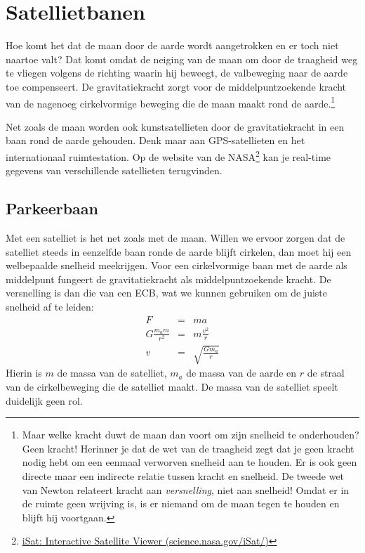\documentclass{ximera}
\begin{document}
	\author{Bart Lambregs}


	\section{Satellietbanen}

	Hoe komt het dat de maan door de aarde wordt aangetrokken en er toch niet naartoe valt? Dat komt omdat de neiging van de maan om door de traagheid weg te vliegen volgens de richting waarin hij beweegt, de valbeweging naar de aarde toe compenseert. De gravitatiekracht zorgt voor de middelpuntzoekende kracht van de nagenoeg cirkelvormige beweging die de maan maakt rond de aarde.\footnote{Maar welke kracht duwt de maan dan voort om zijn snelheid te onderhouden? Geen kracht! Herinner je dat de wet van de traagheid zegt dat je geen kracht nodig hebt om een eenmaal verworven snelheid aan te houden. Er is ook geen directe maar een indirecte relatie tussen kracht en snelheid. De tweede wet van Newton relateert kracht aan \textit{versnelling}, niet aan snelheid! Omdat er in de ruimte geen wrijving is, is er niemand om de maan tegen te houden en blijft hij voortgaan.}
	
	Net zoals de maan worden ook kunstsatellieten door de gravitatiekracht in een baan rond de aarde gehouden. Denk maar aan GPS-satellieten en het internationaal ruimtestation. Op de website van de NASA\footnote{\href{http://science.nasa.gov/iSat/}{iSat: Interactive Satellite Viewer (science.nasa.gov/iSat/)}} kan je real-time gegevens van verschillende satellieten terugvinden.
	
	\subsection{Parkeerbaan}
	
	Met een satelliet is het net zoals met de maan. Willen we ervoor zorgen dat de satelliet steeds in eenzelfde baan ronde de aarde blijft cirkelen, dan moet hij een welbepaalde snelheid meekrijgen. Voor een cirkelvormige baan met de aarde als middelpunt fungeert de gravitatiekracht als middelpuntzoekende kracht. De versnelling is dan die van een ECB, wat we kunnen gebruiken om de juiste snelheid af te leiden:
	\begin{eqnarray*}
	F&=&ma\\
	G\frac{m_am}{r^2}&=&m\frac{v^2}{r}\\
	v&=&\sqrt{\frac{Gm_a}{r}}
	\end{eqnarray*}
	Hierin is $m$ de massa van de satelliet, $m_a$ de massa van de aarde en $r$ de straal van de cirkelbeweging die de satelliet maakt. De massa van de satelliet speelt duidelijk geen rol. 
	
\end{document}
